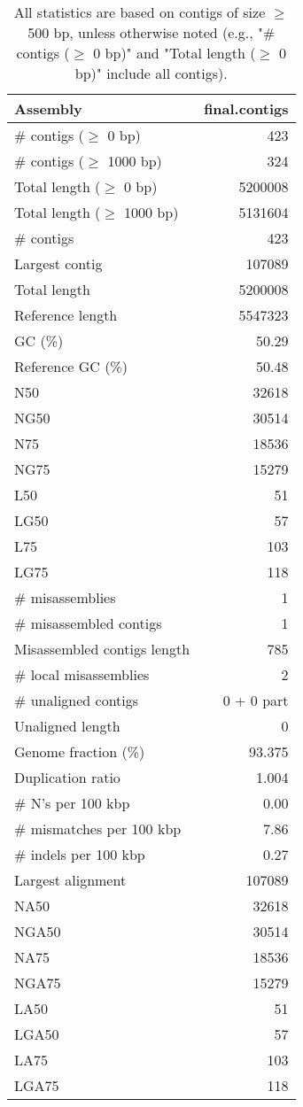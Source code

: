 \documentclass[12pt,a4paper]{article}
\begin{document}
\begin{table}[ht]
\begin{center}
\caption{All statistics are based on contigs of size $\geq$ 500 bp, unless otherwise noted (e.g., "\# contigs ($\geq$ 0 bp)" and "Total length ($\geq$ 0 bp)" include all contigs).}
\begin{tabular}{|l*{1}{|r}|}
\hline
Assembly & final.contigs \\ \hline
\# contigs ($\geq$ 0 bp) & 423 \\ \hline
\# contigs ($\geq$ 1000 bp) & 324 \\ \hline
Total length ($\geq$ 0 bp) & 5200008 \\ \hline
Total length ($\geq$ 1000 bp) & 5131604 \\ \hline
\# contigs & 423 \\ \hline
Largest contig & 107089 \\ \hline
Total length & 5200008 \\ \hline
Reference length & 5547323 \\ \hline
GC (\%) & 50.29 \\ \hline
Reference GC (\%) & 50.48 \\ \hline
N50 & 32618 \\ \hline
NG50 & 30514 \\ \hline
N75 & 18536 \\ \hline
NG75 & 15279 \\ \hline
L50 & 51 \\ \hline
LG50 & 57 \\ \hline
L75 & 103 \\ \hline
LG75 & 118 \\ \hline
\# misassemblies & 1 \\ \hline
\# misassembled contigs & 1 \\ \hline
Misassembled contigs length & 785 \\ \hline
\# local misassemblies & 2 \\ \hline
\# unaligned contigs & 0 + 0 part \\ \hline
Unaligned length & 0 \\ \hline
Genome fraction (\%) & 93.375 \\ \hline
Duplication ratio & 1.004 \\ \hline
\# N's per 100 kbp & 0.00 \\ \hline
\# mismatches per 100 kbp & 7.86 \\ \hline
\# indels per 100 kbp & 0.27 \\ \hline
Largest alignment & 107089 \\ \hline
NA50 & 32618 \\ \hline
NGA50 & 30514 \\ \hline
NA75 & 18536 \\ \hline
NGA75 & 15279 \\ \hline
LA50 & 51 \\ \hline
LGA50 & 57 \\ \hline
LA75 & 103 \\ \hline
LGA75 & 118 \\ \hline
\end{tabular}
\end{center}
\end{table}
\end{document}
